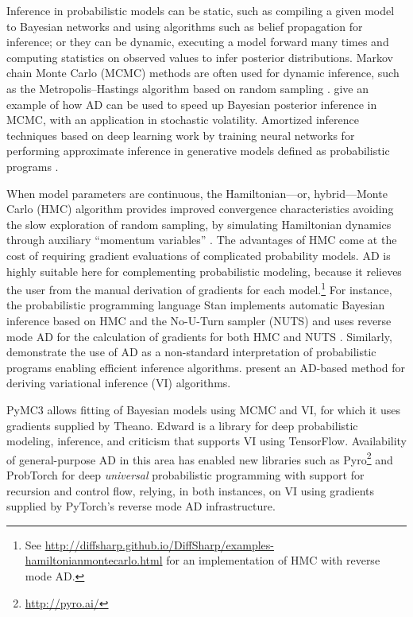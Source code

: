 \documentclass[twoside,11pt]{article}
\begin{document}
Inference in probabilistic models can be static, such as compiling a given model to Bayesian networks and using algorithms such as belief propagation for inference; or they can be dynamic, executing a model forward many times and computing statistics on observed values to infer posterior distributions. Markov chain Monte Carlo (MCMC) \citep{Neal1993} methods are often used for dynamic inference, such as the Metropolis--Hastings algorithm based on random sampling \citep{Chib1995}. \citet{Meyer2003} give an example of how AD can be used to speed up Bayesian posterior inference in MCMC, with an application in stochastic volatility. Amortized inference \citep{gershman2014amortized,stuhlmuller2013learning} techniques based on deep learning \citep{le2016inference,ritchie2016deep} work by training neural networks for performing approximate inference in generative models defined as probabilistic programs \citep{gordon2014probabilistic}.

When model parameters are continuous, the Hamiltonian---or, hybrid---Monte Carlo (HMC) algorithm provides improved convergence characteristics avoiding the slow exploration of random sampling, by simulating Hamiltonian dynamics through auxiliary ``momentum variables'' \citep{Duane1987}. The advantages of HMC come at the cost of requiring gradient evaluations of complicated probability models. AD is highly suitable here for complementing probabilistic modeling, because it relieves the user from the manual derivation of gradients for each model.\footnote{See \url{http://diffsharp.github.io/DiffSharp/examples-hamiltonianmontecarlo.html} for an implementation of HMC with reverse mode AD.} For instance, the probabilistic programming language Stan \citep{carpenter2016stan} implements automatic Bayesian inference based on HMC and the No-U-Turn sampler (NUTS) \citep{Hoffman2014} and uses reverse mode AD for the calculation of gradients for both HMC and NUTS \citep{carpenter2015stan}. Similarly, \citet{Wingate2011} demonstrate the use of AD as a non-standard interpretation of probabilistic programs enabling efficient inference algorithms. \citet{kucukelbir2017automatic} present an AD-based method for deriving variational inference (VI) algorithms.

PyMC3 \citep{salvatier2016probabilistic} allows fitting of Bayesian models using MCMC and VI, for which it uses gradients supplied by Theano. Edward \citep{tran2016edward} is a library for deep probabilistic modeling, inference, and criticism \citep{tran2017deep} that supports VI using TensorFlow. Availability of general-purpose AD in this area has enabled new libraries such as Pyro\footnote{\url{http://pyro.ai/}} and ProbTorch \citep{siddharth2017learning} for deep \emph{universal} probabilistic programming with support for recursion and control flow, relying, in both instances, on VI using gradients supplied by PyTorch's reverse mode AD infrastructure.
\end{document}

